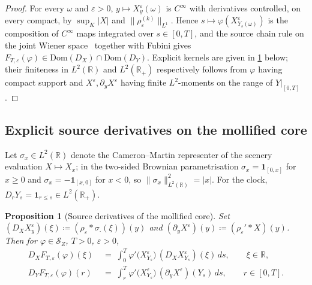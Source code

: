 \documentclass[11pt,reqno]{amsart}
\theoremstyle{plain}
\newtheorem{proposition}[theorem]{Proposition}
\theoremstyle{definition}
\theoremstyle{remark}
\newcommand{\R}{\mathbb{R}}
\newcommand{\Dom}{\mathrm{Dom}}
\newcommand{\IBM}{Z}
\begin{document}
\begin{proof}
For every $\omega$ and $\varepsilon>0$, $y\mapsto X^\varepsilon_y(\omega)$
is $C^\infty$ with derivatives controlled, on every compact, by
$\sup_K|X|$ and $\|\rho_\varepsilon^{(k)}\|_{L^1}$. Hence
$s\mapsto\varphi(X^\varepsilon_{Y_s(\omega)})$ is the composition of
$C^\infty$ maps integrated over $s\in[0,T]$, and the source chain rule
on the joint Wiener space~\cite[\S1.2]{Nualart} together with Fubini
gives $F_{T,\varepsilon}(\varphi)\in\Dom(D_X)\cap\Dom(D_Y)$. Explicit
kernels are given in \cref{prop:moll-deriv} below; their finiteness in
$L^{2}(\R)$ and $L^{2}(\R_{+})$ respectively follows from $\varphi$
having compact support and $X^\varepsilon,\partial_yX^\varepsilon$ having
finite $L^{2}$-moments on the range of $Y|_{[0,T]}$.
\end{proof}

\subsection*{Explicit source derivatives on the mollified core}

Let $\sigma_x\in L^{2}(\R)$ denote the Cameron--Martin representer of
the scenery evaluation $X\mapsto X_x$; in the two-sided Brownian
parametrisation $\sigma_x=\mathbf 1_{[0,x]}$ for $x\ge 0$ and
$\sigma_x=-\mathbf 1_{[x,0]}$ for $x<0$, so
$\|\sigma_x\|_{L^{2}(\R)}^{2}=|x|$. For the clock,
$D_rY_s=\mathbf 1_{r\le s}\in L^{2}(\R_{+})$.

\begin{proposition}[Source derivatives of the mollified core]
\label{prop:moll-deriv}
Set $(D_XX^\varepsilon_y)(\xi)\coloneqq(\rho_\varepsilon*\sigma_\cdot(\xi))(y)$
and $(\partial_yX^\varepsilon)(y)\coloneqq(\rho_\varepsilon'*X)(y)$. Then
for $\varphi\in\mathscr S_\IBM$, $T>0$, $\varepsilon>0$,
\begin{align}
  D_X F_{T,\varepsilon}(\varphi)(\xi)
  &\;=\;\int_0^T\varphi'\bigl(X^\varepsilon_{Y_s}\bigr)\,
         (D_XX^\varepsilon_{Y_s})(\xi)\,ds,
         \qquad\xi\in\R,
         \label{eq:DX-moll}\\[2pt]
  D_Y F_{T,\varepsilon}(\varphi)(r)
  &\;=\;\int_r^T\varphi'\bigl(X^\varepsilon_{Y_s}\bigr)\,
         (\partial_yX^\varepsilon)(Y_s)\,ds,
         \qquad r\in[0,T].
         \label{eq:DY-moll}
\end{align}
\end{proposition}
\end{document}

